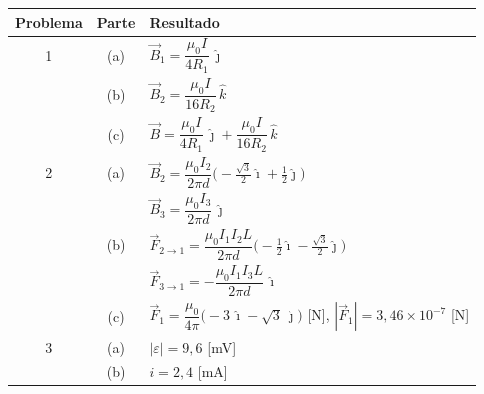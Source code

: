 \documentclass[12pt,letterpaper]{article}
\newcommand{\eps}{\varepsilon}
\begin{document}
\begin{center}
\renewcommand{\arraystretch}{1.5}
\begin{tabular}{|c|c|l|}
\hline
\textbf{Problema} & \textbf{Parte} & \textbf{Resultado} \\
\hline
1 & (a) & $\vec{B}_1 = \dfrac{\mu_0 I}{4R_1}\,\hat{\jmath}$ \\
  & (b) & $\vec{B}_2 = \dfrac{\mu_0 I}{16R_2}\,\hat{k}$ \\
  & (c) & $\vec{B} = \dfrac{\mu_0 I}{4R_1}\,\hat{\jmath} + \dfrac{\mu_0 I}{16R_2}\,\hat{k}$ \\
\hline
2 & (a) & $\vec{B}_2 = \dfrac{\mu_0 I_2}{2\pi d}\bigl(-\tfrac{\sqrt3}{2}\hat{\imath} + \tfrac12\hat{\jmath}\bigr)$ \\
  &     & $\vec{B}_3 = \dfrac{\mu_0 I_3}{2\pi d}\,\hat{\jmath}$ \\
  & (b) & $\vec{F}_{2\to1} = \dfrac{\mu_0 I_1 I_2 L}{2\pi d}\bigl(-\tfrac12\hat{\imath} - \tfrac{\sqrt3}{2}\hat{\jmath}\bigr)$ \\
  &     & $\vec{F}_{3\to1} = -\dfrac{\mu_0 I_1 I_3 L}{2\pi d}\,\hat{\imath}$ \\
  & (c) & $\vec{F}_1 = \dfrac{\mu_0}{4\pi}\bigl(-3\,\hat{\imath} - \sqrt{3}\,\hat{\jmath}\bigr)$ [N],\quad
          $|\vec{F}_1| = 3{,}46\times10^{-7}$ [N] \\
\hline
3 & (a) & $|\eps| = 9{,}6$ [mV] \\
  & (b) & $i = 2{,}4$ [mA] \\
\hline
\end{tabular}
\end{center}
\end{document}
